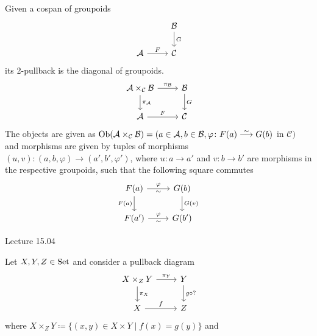\begin{construction}
    Given a cospan of groupoids 
    \[
    \begin{tikzcd}
        &
        \mathcal{B}
        \ar[d, " G "]
        \\
        \mathcal{ A }
        \ar[r, " F "]
        &
        \mathcal{ C }
    \end{tikzcd}
    \]
    its 2-pullback is the diagonal of groupoids.
    \[
    \begin{tikzcd}
        \mathcal{ A } \times_{ \mathcal{ C } } \mathcal{ B } 
        \ar[r, " \pi_{ \mathcal{ B }} "]
        \ar[d, " \pi_{ \mathcal{ A }} "]
        &
        \mathcal{ B }
        \ar[ d , " G " ]
        \\
        \mathcal{ A }
        \ar[r, " F " ]
        &
        \mathcal{ C }
    \end{tikzcd}
    \]
    The objects are given as $ \Ob ( \mathcal{ A } \times_\mathcal{ C } \mathcal{ B } ) = ( a \in \mathcal{ A } , b \in \mathcal{ B }, \varphi \colon F ( a ) \isomorphism G ( b ) $ in $ \mathcal{ C } )$ and morphisms are given by tuples of morphisms $ ( u , v ) \colon ( a , b, \varphi ) \to ( a' , b' , \varphi' ) $, where $ u \colon a \to a' $ and $ v \colon b \to b '$ are morphisms in the respective groupoids, such that the following square commutes
    \[
    \begin{tikzcd}
        F ( a ) 
        \ar[r, "\varphi" , " \sim "']
        \ar[d, "F( a )"']
        &
        G ( b )
        \ar[d, " G ( v )"]
        \\
        F ( a' )
        \ar[r, "\varphi", "\sim"']
        &
        G(b')
    \end{tikzcd}
    \]
\end{construction}

Lecture 15.04

Let $ X ,  Y , Z \in \operatorname{Set} $ and consider a pullback diagram 
\[
\begin{tikzcd}
	X \times_Z Y 
	\ar[r, " \pi_Y "]
	\ar[d, " \pi_X "]
	&
	Y
	\ar[d, " g \circ ?"]
	\\
	X
	\ar[r, " f"]
	&
	Z    
\end{tikzcd}
\]
where $ X \times_Z Y \coloneqq \{ ( x , y ) \in X \times Y \mid f ( x ) = g ( y ) \}$ and 
\begin{comment}
\[
\begin{align*}
	\Hom_{\Set} ( \prescript{\forall}{}{W} , X \times_Z  Y ) 
	&\isomorphism
	\Hom_{ \Set } ( W , X ) \times_{\Hom_{\Set} ( W , Z ) } \Hom_{ \Set } (  W , Y ) 
	\\
	(\varphi \colon W \to X \times_Z Y ) 
	&\mapsto
	\left(
	\begin{tikzcd}
		W 
		\ar[r, " \pi_Y \circ \varphi "]
		\ar[d , " \pi_X \circ \varphi "]
		&
		Y
		\ar[d, "g"]
		\\
		X
		\ar[r, "f"]
		&
		Z        
	\end{tikzcd} 
	\right)
\end{align*}
\]
\end{comment}

